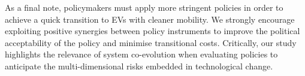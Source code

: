 \documentclass[12pt]{article}
\begin{document}







	As a final note, policymakers must apply more stringent policies in order to achieve a quick transition to EVs with cleaner mobility. We strongly encourage exploiting positive synergies between policy instruments to improve the political acceptability of the policy and minimise transitional costs. Critically, our study highlights the relevance of system co-evolution when evaluating policies to anticipate the multi-dimensional risks embedded in technological change.  %
\end{document}
